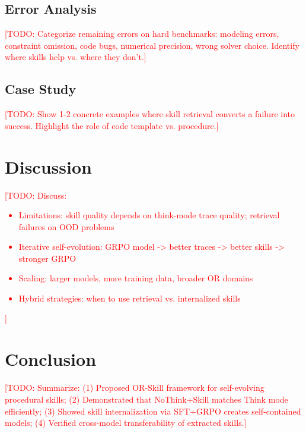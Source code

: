 \documentclass[11pt]{article}
\newcommand{\todo}[1]{\textcolor{red}{[TODO: #1]}}
\begin{document}
\subsection{Error Analysis}
\todo{Categorize remaining errors on hard benchmarks: modeling errors, constraint omission, code bugs, numerical precision, wrong solver choice. Identify where skills help vs. where they don't.}

\subsection{Case Study}
\todo{Show 1-2 concrete examples where skill retrieval converts a failure into success. Highlight the role of code template vs. procedure.}

\section{Discussion}
\label{sec:discussion}

\todo{Discuss:
\begin{itemize}
    \item Limitations: skill quality depends on think-mode trace quality; retrieval failures on OOD problems
    \item Iterative self-evolution: GRPO model -> better traces -> better skills -> stronger GRPO
    \item Scaling: larger models, more training data, broader OR domains
    \item Hybrid strategies: when to use retrieval vs. internalized skills
\end{itemize}
}

\section{Conclusion}
\label{sec:conclusion}

\todo{Summarize: (1) Proposed OR-Skill framework for self-evolving procedural skills; (2) Demonstrated that NoThink+Skill matches Think mode efficiently; (3) Showed skill internalization via SFT+GRPO creates self-contained models; (4) Verified cross-model transferability of extracted skills.}



\end{document}
